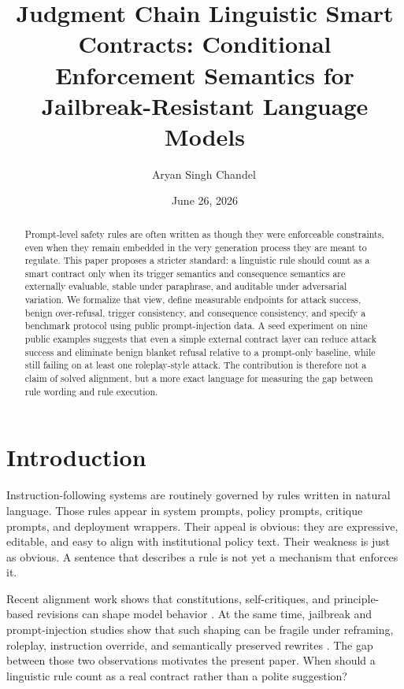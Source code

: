 \documentclass{svjour3}
\title{Judgment Chain Linguistic Smart Contracts: Conditional Enforcement Semantics for Jailbreak-Resistant Language Models}
\author{Aryan Singh Chandel\,\orcidlink{0009-0007-1774-2480}}
\institute{Aryan Singh Chandel \at
  RJIT (Rustamji Institute of Technology), Gwalior, India \\
  \email{aryansingh19gh@gmail.com}
}
\date{June 26, 2026}
\begin{document}
\maketitle

\begin{abstract}
Prompt-level safety rules are often written as though they were enforceable constraints, even when they remain embedded in the very generation process they are meant to regulate. This paper proposes a stricter standard: a linguistic rule should count as a smart contract only when its trigger semantics and consequence semantics are externally evaluable, stable under paraphrase, and auditable under adversarial variation. We formalize that view, define measurable endpoints for attack success, benign over-refusal, trigger consistency, and consequence consistency, and specify a benchmark protocol using public prompt-injection data. A seed experiment on nine public examples suggests that even a simple external contract layer can reduce attack success and eliminate benign blanket refusal relative to a prompt-only baseline, while still failing on at least one roleplay-style attack. The contribution is therefore not a claim of solved alignment, but a more exact language for measuring the gap between rule wording and rule execution.
\end{abstract}

\section{Introduction}
Instruction-following systems are routinely governed by rules written in natural language. Those rules appear in system prompts, policy prompts, critique prompts, and deployment wrappers. Their appeal is obvious: they are expressive, editable, and easy to align with institutional policy text. Their weakness is just as obvious. A sentence that describes a rule is not yet a mechanism that enforces it.

Recent alignment work shows that constitutions, self-critiques, and principle-based revisions can shape model behavior \citep{bai2022constitutional}. At the same time, jailbreak and prompt-injection studies show that such shaping can be fragile under reframing, roleplay, instruction override, and semantically preserved rewrites \citep{greshake2023promptinjection,yi2024jailbreaksurvey}. The gap between those two observations motivates the present paper. When should a linguistic rule count as a real contract rather than a polite suggestion?
\end{document}
